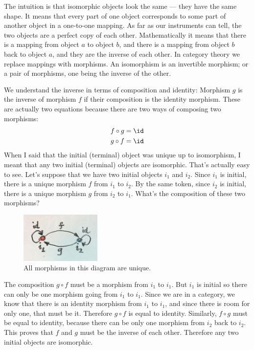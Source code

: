 The intuition is that isomorphic objects look the same --- they have the
same shape. It means that every part of one object corresponds to some
part of another object in a one-to-one mapping. As far as our
instruments can tell, the two objects are a perfect copy of each other.
Mathematically it means that there is a mapping from object $a$ to
object $b$, and there is a mapping from object $b$ back to
object $a$, and they are the inverse of each other. In category
theory we replace mappings with morphisms. An isomorphism is an
invertible morphism; or a pair of morphisms, one being the inverse of
the other.

We understand the inverse in terms of composition and identity: Morphism
$g$ is the inverse of morphism $f$ if their composition is the
identity morphism. These are actually two equations because there are
two ways of composing two morphisms:
\begin{gather*}
f \circ g = \id \\
g \circ f = \id
\end{gather*}
When I said that the initial (terminal) object was unique up to
isomorphism, I meant that any two initial (terminal) objects are
isomorphic. That's actually easy to see. Let's suppose that we have two
initial objects $i_{1}$ and $i_{2}$. Since
$i_{1}$ is initial, there is a unique morphism $f$ from
$i_{1}$ to $i_{2}$. By the same token, since
$i_{2}$ is initial, there is a unique morphism $g$ from
$i_{2}$ to $i_{1}$. What's the composition of
these two morphisms?

\begin{figure}[H]
\centering
\includegraphics[width=40mm]{images/uniqueness.jpg}
\caption{All morphisms in this diagram are unique.}
\end{figure}

\noindent
The composition $g \circ f$ must be a morphism from $i_{1}$ to
$i_{1}$. But $i_{1}$ is initial so there can only
be one morphism going from $i_{1}$ to $i_{1}$.
Since we are in a category, we know that there is an identity morphism
from $i_{1}$ to $i_{1}$, and since there is room
for only one, that must be it. Therefore $g \circ f$ is equal to
identity. Similarly, $f \circ g$ must be equal to identity, because there
can be only one morphism from $i_{2}$ back to
$i_{2}$. This proves that $f$ and $g$ must be the
inverse of each other. Therefore any two initial objects are isomorphic.

